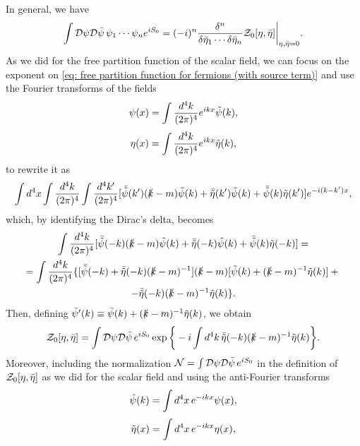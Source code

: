 In general, we have 
\begin{equation}
    \int \mathcal{D}\psi\mathcal{D}\bar{\psi}\,\psi_1\cdots\psi_ne^{iS_0} = (-i)^n\frac{\delta^n}{\delta\bar{\eta}_1\cdots\delta\bar{\eta}_n}\mathcal{Z}_0[\eta,\bar{\eta}]\bigg|_{\eta,\bar{\eta} = 0}.
\end{equation}
As we did for the free partition function of the scalar field, we can focus on the exponent on \eqref{eq: free partition function for fermions (with source term)} and use the Fourier transforms of the fields
\begin{equation}
    \psi(x) = \int \frac{d^4k}{(2\pi)^4}e^{ikx}\tilde{\psi}(k),
\end{equation}
\begin{equation}
    \eta(x) = \int \frac{d^4k}{(2\pi)^4}e^{ikx}\tilde{\eta}(k),
\end{equation}
to rewrite it as 
\begin{equation}
    \int d^4x\int\frac{d^4k}{(2\pi)^4}\int\frac{d^4k'}{(2\pi)^4}[\bar{\tilde{\psi}}(k')(\slashed{k} - m)\tilde{\psi}(k) + \bar{\tilde{\eta}}(k')\tilde{\psi}(k) + \bar{\tilde{\psi}}(k)\tilde{\eta}(k')]e^{-i(k - k')x},
\end{equation}
which, by identifying the Dirac's delta, becomes 
\begin{multline}
    \int\frac{d^4k}{(2\pi)^4}[\bar{\tilde{\psi}}(-k)(\slashed{k} - m)\tilde{\psi}(k) + \bar{\tilde{\eta}}(-k)\tilde{\psi}(k) + \bar{\tilde{\psi}}(k)\tilde{\eta}(-k)] = \\
    = \int\frac{d^4k}{(2\pi)^4}\{[\bar{\tilde{\psi}}(-k) + \bar{\tilde{\eta}}(-k)(\slashed{k} - m)^{-1}](\slashed{k} - m)[\tilde{\psi}(k) + (\slashed{k} - m)^{-1}\tilde{\eta}(k)] + {} \\
    - \bar{\tilde{\eta}}(-k)(\slashed{k} - m)^{-1}\tilde{\eta}(k)\}.
\end{multline}
Then, defining $\tilde{\psi}'(k) \equiv \tilde{\psi}(k) + (\slashed{k} - m)^{-1}\tilde{\eta}(k)$, we obtain 
\begin{equation}
    \mathcal{Z}_0[\eta,\bar{\eta}] = \int\mathcal{D}\psi\mathcal{D}\bar{\psi}\,e^{iS_0}\exp{\bigg\{-i\int d^4k\,\bar{\tilde{\eta}}(-k)(\slashed{k} - m)^{-1}\tilde{\eta}(k)\bigg\}}.
\end{equation}
Moreover, including the normalization $\mathcal{N} = \int \mathcal{D}\psi\mathcal{D}\bar{\psi}\,e^{iS_0}$ in the definition of $\mathcal{Z}_0[\eta,\bar{\eta}]$ as we did for the scalar field and using the anti-Fourier transforms 
\begin{equation}
    \tilde{\psi}(k) = \int d^4x\,e^{-ikx}\psi(x),
\end{equation}
\begin{equation}
    \tilde{\eta}(x) = \int d^4x\,e^{-ikx}\eta(x),
\end{equation}
